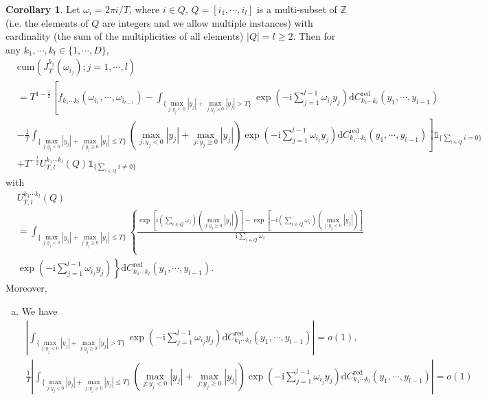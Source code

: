 \documentclass[11pt]{article}
\numberwithin{equation}{section}
\theoremstyle{plain}
\theoremstyle{definition}
\theoremstyle{definition}
\theoremstyle{assumption}
\theoremstyle{proposition}
\theoremstyle{proposition}
\newtheorem{corollary}{Corollary}[section]
\theoremstyle{example}
\theoremstyle{lemma}
\theoremstyle{theorem}
\theoremstyle{remark}
\begin{document}
\begin{corollary}\label{cum_J_corollary}
Let $\omega_i = 2\pi i/T$, where $i\in Q$, $Q=[i_1,\cdots,i_{l}]$ is a multi-subset of $\mathbb{Z}$ (i.e. the elements of $Q$ are integers and we allow multiple instances) with cardinality (the sum of the multiplicities of all elements) $|Q|=l\geqslant2$. Then for any $k_1,\cdots,k_l\in\{1,\cdots,D\}$,
\begin{align*}
&\mathrm{cum}(J_T^{k_j}(\omega_{i_j});j=1,\cdots,l) \\
&= T^{1-\frac{l}{2}}\left[f_{k_1\cdots k_l}(\omega_{i_1},\cdots,\omega_{i_{l-1}}) -\int_{\{\max_{j:y_j<0}|y_j| + \max_{j:y_j\geqslant0}|y_j|> T\}}\exp\left(-\mathrm{i}\sum_{j=1}^{l-1}\omega_{i_j} y_j\right) \mathrm{d}C_{k_1\cdots k_l}^{\mathrm{red}}(y_1, \cdots, y_{l-1}) \right. \\
&\left. -\frac{1}{T}\int_{\{\max_{j:y_j<0}|y_j| + \max_{j:y_j\geqslant0}|y_j|\leqslant T\}}\left(\max_{j:y_j<0}|y_j| + \max_{j:y_j\geqslant0}|y_j|\right)\exp\left(-\mathrm{i}\sum_{j=1}^{l-1}\omega_{i_j} y_j\right) \mathrm{d}C_{k_1\cdots k_l}^{\mathrm{red}}(y_1, \cdots, y_{l-1})\right]\mathds{1}_{\{\sum_{i\in Q}i = 0\}} \\
&+ T^{-\frac{l}{2}} U_{T,l}^{k_1\cdots k_l}\left(Q\right)\mathds{1}_{\{\sum_{i\in Q}i \neq 0\}}
\end{align*}
with
\begin{align*}
&U_{T,l}^{k_1\cdots k_l}\left(Q\right) \\
&=\int_{\{\max_{j:y_j<0}|y_j| + \max_{j:y_j\geqslant0}|y_j|\leqslant T\}} \left\{\frac{\exp\left[\mathrm{i}\left(\sum_{i\in Q}\omega_i\right)\left(\max_{j:y_j\geqslant0}|y_j|\right)\right] - \exp\left[-\mathrm{i}\left(\sum_{i\in Q}\omega_i\right)\left(\max_{j:y_j<0}|y_j|\right)\right] }{\mathrm{i}\sum_{i\in Q}\omega_i} \right.\\
&\left. \exp\left(-\mathrm{i}\sum_{j=1}^{l-1}\omega_{i_j} y_j\right) \right\} \mathrm{d}C_{k_1\cdots k_l}^{\mathrm{red}}(y_1, \cdots, y_{l-1}) .
\end{align*}
Moreover,
\begin{enumerate}[(a)]
\item We have
\begin{align*}
\left|\int_{\{\max_{j:y_j<0}|y_j| + \max_{j:y_j\geqslant0}|y_j|> T\}}\exp\left(-\mathrm{i}\sum_{j=1}^{l-1}\omega_{i_j} y_j\right) \mathrm{d}C_{k_1\cdots k_l}^{\mathrm{red}}(y_1, \cdots, y_{l-1}) \right|
=o(1),
\end{align*}
\begin{align*}
\frac{1}{T}\left|\int_{\{\max_{j:y_j<0}|y_j| + \max_{j:y_j\geqslant0}|y_j|\leqslant T\}}\left(\max_{j:y_j<0}|y_j| + \max_{j:y_j\geqslant0}|y_j|\right)\exp\left(-\mathrm{i}\sum_{j=1}^{l-1}\omega_{i_j} y_j\right) \mathrm{d}C_{k_1\cdots k_l}^{\mathrm{red}}(y_1, \cdots, y_{l-1})\right| = o(1)

\end{align*}
\end{enumerate}
\end{corollary}
\end{document}
